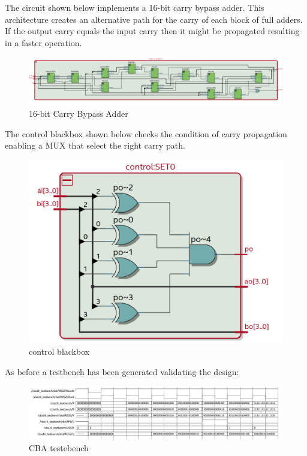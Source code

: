 \documentclass[12pt]{article}
\begin{document}
The circuit shown below implements a 16-bit carry bypass adder. This architecture creates an alternative path for the carry of each block of full adders. If the output carry equals the input carry then it might be propagated resulting in a faster operation.
\begin{figure}[!h]
	\centering
	\includegraphics[scale = 0.45]{immagini/niki/parte2_rtl.png}
	\caption{16-bit Carry Bypass Adder}       
\end{figure}

The control blackbox shown below checks the condition of carry propagation enabling a MUX that select the right carry path.

\begin{figure}[!h]
	\centering
	\includegraphics[scale = 0.2]{immagini/niki/rtl2.png}
	\caption{control blackbox}       
\end{figure}
\newpage
As before a testbench has been generated validating the design:

\begin{figure}[!h]
	\centering
	\includegraphics[scale = 0.58]{immagini/niki/testbench2.png}
	\caption{CBA testebench}       
\end{figure}
\end{document}
